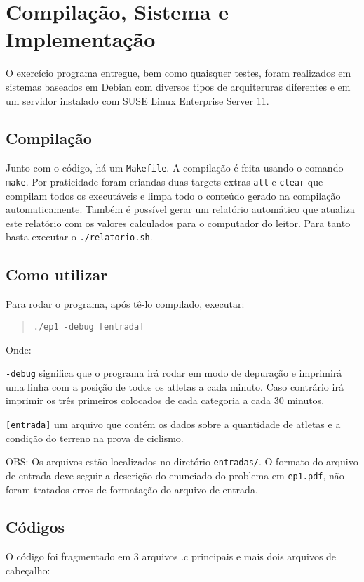 \documentclass[12pt,a4paper]{article}
\begin{document}
\pagebreak
\section{Compilação, Sistema e Implementação}
O exercício programa entregue, bem como quaisquer testes, foram realizados em sistemas baseados em Debian com diversos tipos de arquiteruras diferentes e em um servidor instalado com SUSE Linux Enterprise Server 11.

\subsection{Compilação}
Junto com o código, há um \verb+Makefile+. A compilação é feita usando o 
comando \verb+make+. Por praticidade foram criandas duas targets extras \verb+all+ e \verb+clear+ que compilam todos os executáveis e limpa todo o conteúdo gerado na compilação automaticamente. Também é possível gerar um relatório automático que atualiza este relatório com os valores calculados para o computador do leitor. Para tanto basta executar o \verb+./relatorio.sh+.

\subsection{Como utilizar}
Para rodar o programa, após tê-lo compilado, executar:
\begin{quote}
\begin{verbatim}
./ep1 -debug [entrada]
\end{verbatim}
\end{quote}

Onde:

\verb+-debug+ significa que o programa irá rodar em modo de depuração e imprimirá uma linha com a posição de todos os atletas a cada minuto. Caso contrário irá imprimir os três primeiros colocados de cada categoria a cada 30 minutos.

\verb+[entrada]+ um arquivo que contém os dados sobre a quantidade de atletas e a condição do terreno na prova de ciclismo.

OBS: Os arquivos estão localizados no diretório \verb+entradas/+. O formato do arquivo de entrada deve seguir a descrição do enunciado do problema em \verb+ep1.pdf+, não foram tratados erros de formatação do arquivo de entrada.

\subsection{Códigos}
O código foi fragmentado em 3 arquivos .c principais e mais dois arquivos de cabeçalho:
\end{document}
